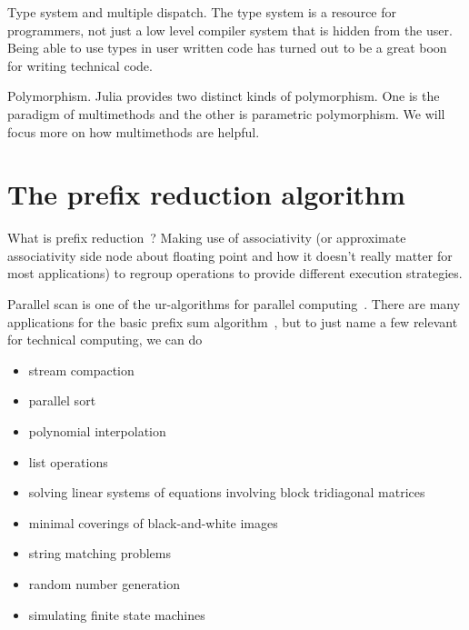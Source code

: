\documentclass{sig-alternate}
\newcommand{\TODO}[1]{\todo[inline]{#1}}
\begin{document}
Type system and multiple dispatch. The type system is a resource for programmers, not just a low level compiler system that is hidden from the user. Being able to use types in user written code has turned out to be a great boon for writing technical code.

Polymorphism. Julia provides two distinct kinds of polymorphism. One is the paradigm of multimethods and the other is parametric polymorphism. We will focus more on how multimethods are helpful.

\TODO{State that we use Julia v0.3.1.}

\section{The prefix reduction algorithm}
\label{sec:prefix}

What is prefix reduction~\cite{Iverson1962,Ladner1980,Brent1982}? Making use of associativity (or approximate associativity side node about floating point and how it doesn't really matter for most applications)  to regroup operations to provide different execution strategies.

Parallel scan is one of the ur-algorithms for parallel computing~\cite{Kruskal1985,Blelloch1989,Bell2012}.
There are many applications for the basic prefix sum algorithm~\cite{Blelloch1990,Blelloch1993}, but to just name a few relevant for technical computing, we can do 

\begin{itemize}

	\item stream compaction~\cite{Harris2007}

	\item parallel sort~\cite{Blelloch1989}

	\item polynomial interpolation~\cite{Egecioglu1990}

	\item list operations~\cite{Hillis1986,Gorlatch1999}

	\item solving linear systems of equations involving block tridiagonal matrices~\cite{Mathias1995}

	\item minimal coverings of black-and-white images~\cite{Moitra1991}

	\item string matching problems~\cite{Chi1992}

	\item random number generation~\cite{Lu1996}

	\item simulating finite state machines~\cite{Ladner1980}
\end{itemize}
\end{document}

